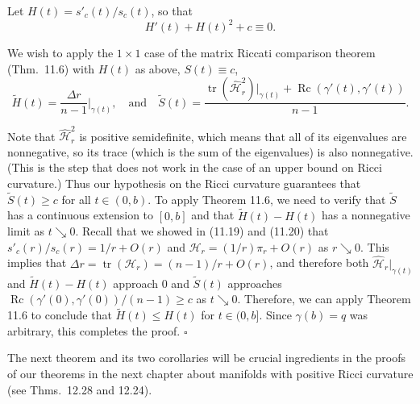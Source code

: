 Let $H(t) = s'_c(t)/s_c(t)$, so that
\[
H'(t) + H(t)^2 + c \equiv 0.
\]

We wish to apply the $1 \times 1$ case of the matrix Riccati comparison theorem (Thm.\ 11.6) with $H(t)$ as above, $S(t) \equiv c$,
\[
\tilde{H}(t) = \frac{\Delta r}{n-1}\Big|_{\gamma(t)}, \quad \text{and} \quad \tilde{S}(t) = \frac{\operatorname{tr}(\hat{\mathcal{H}}^2_r)|_{\gamma(t)} + \operatorname{Rc}(\gamma'(t), \gamma'(t))}{n-1}.
\]

Note that $\hat{\mathcal{H}}^2_r$ is positive semidefinite, which means that all of its eigenvalues are nonnegative, so its trace (which is the sum of the eigenvalues) is also nonnegative. (This is the step that does not work in the case of an upper bound on Ricci curvature.) Thus our hypothesis on the Ricci curvature guarantees that $\tilde{S}(t) \geq c$ for all $t \in (0, b)$. To apply Theorem 11.6, we need to verify that $\tilde{S}$ has a continuous extension to $[0, b]$ and that $\tilde{H}(t) - H(t)$ has a nonnegative limit as $t \searrow 0$. Recall that we showed in (11.19) and (11.20) that $s'_c(r)/s_c(r) = 1/r + O(r)$ and $\mathcal{H}_r = (1/r)\pi_r + O(r)$ as $r \searrow 0$. This implies that $\Delta r = \operatorname{tr}(\mathcal{H}_r) = (n-1)/r + O(r)$, and therefore both $\hat{\mathcal{H}}_r|_{\gamma(t)}$ and $\tilde{H}(t) - H(t)$ approach $0$ and $\tilde{S}(t)$ approaches $\operatorname{Rc}(\gamma'(0), \gamma'(0))/(n-1) \geq c$ as $t \searrow 0$. Therefore, we can apply Theorem 11.6 to conclude that $\tilde{H}(t) \leq H(t)$ for $t \in (0, b]$. Since $\gamma(b) = q$ was arbitrary, this completes the proof. \quad $\square$

The next theorem and its two corollaries will be crucial ingredients in the proofs of our theorems in the next chapter about manifolds with positive Ricci curvature (see Thms.\ 12.28 and 12.24).

